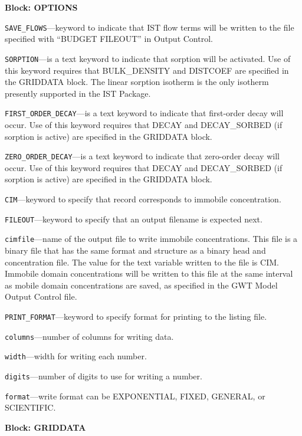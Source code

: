 
\item \textbf{Block: OPTIONS}

\begin{description}
\item \texttt{SAVE\_FLOWS}---keyword to indicate that IST flow terms will be written to the file specified with ``BUDGET FILEOUT'' in Output Control.

\item \texttt{SORPTION}---is a text keyword to indicate that sorption will be activated.  Use of this keyword requires that BULK\_DENSITY and DISTCOEF are specified in the GRIDDATA block.  The linear sorption isotherm is the only isotherm presently supported in the IST Package.

\item \texttt{FIRST\_ORDER\_DECAY}---is a text keyword to indicate that first-order decay will occur.  Use of this keyword requires that DECAY and DECAY\_SORBED (if sorption is active) are specified in the GRIDDATA block.

\item \texttt{ZERO\_ORDER\_DECAY}---is a text keyword to indicate that zero-order decay will occur.  Use of this keyword requires that DECAY and DECAY\_SORBED (if sorption is active) are specified in the GRIDDATA block.

\item \texttt{CIM}---keyword to specify that record corresponds to immobile concentration.

\item \texttt{FILEOUT}---keyword to specify that an output filename is expected next.

\item \texttt{cimfile}---name of the output file to write immobile concentrations.  This file is a binary file that has the same format and structure as a binary head and concentration file.  The value for the text variable written to the file is CIM.  Immobile domain concentrations will be written to this file at the same interval as mobile domain concentrations are saved, as specified in the GWT Model Output Control file.

\item \texttt{PRINT\_FORMAT}---keyword to specify format for printing to the listing file.

\item \texttt{columns}---number of columns for writing data.

\item \texttt{width}---width for writing each number.

\item \texttt{digits}---number of digits to use for writing a number.

\item \texttt{format}---write format can be EXPONENTIAL, FIXED, GENERAL, or SCIENTIFIC.

\end{description}
\item \textbf{Block: GRIDDATA}

